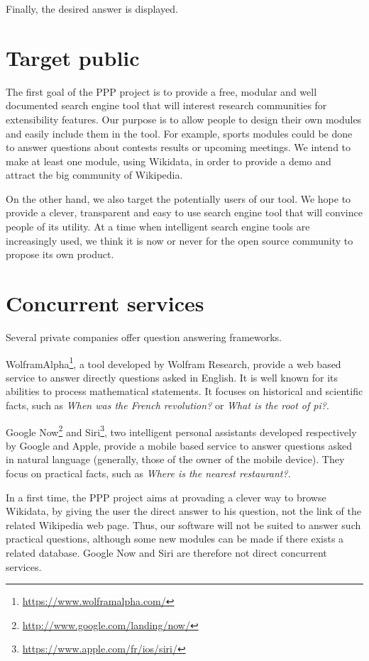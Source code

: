 \documentclass[a4paper,10pt]{article}
\begin{document}
Finally, the desired answer is displayed.

\section{Target public}

The first goal of the PPP project is to provide a free, modular and well documented search engine tool that will 
interest research communities for extensibility features. Our purpose is to allow people to design their own modules and
easily include them in the tool. For example, sports modules could be done to answer questions about contests results or 
upcoming meetings. We intend to make at least one module, using Wikidata, in order to provide a demo and attract the big 
community of Wikipedia. 

On the other hand, we also target the potentially users of our tool. We hope to provide a clever, transparent and easy to use search 
engine tool that will convince people of its utility. At a time when intelligent search engine tools are increasingly used, we think it is
now or never for the open source community to propose its own product.

\section{Concurrent services}

Several private companies offer question answering frameworks. 

WolframAlpha\footnote{\url{https://www.wolframalpha.com/}}, a tool developed by 
Wolfram Research, provide a web based service to answer directly questions asked
in English. It is well known for its abilities to process mathematical statements.
It focuses on historical and scientific facts, such as \emph{When was the French 
revolution?} or \emph{What is the root of pi?}.

Google Now\footnote{\url{http://www.google.com/landing/now/}} and Siri\footnote{\url{https://www.apple.com/fr/ios/siri/}}, two intelligent personal assistants
developed respectively by Google and Apple, provide a mobile based service to 
answer questions asked in natural language (generally, those of the owner of the
mobile device). They focus on practical facts, such as \emph{Where is the nearest
restaurant?}.

In a first time, the PPP project aims at provading a clever way to browse Wikidata, by giving the 
user the direct answer to his question, not the link of the related Wikipedia
web page. Thus, our software will not be suited to answer such practical questions,
although some new modules can be made if there exists a related database. Google Now
and Siri are therefore not direct concurrent services.
\end{document}
